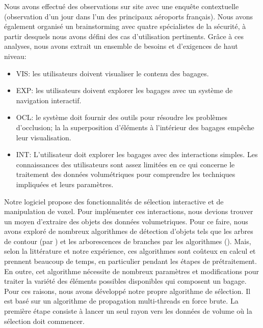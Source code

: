 Nous avons effectué des observations sur site avec une enquête contextuelle (observation d'un jour dans l'un des principaux aéroports français). Nous avons également organisé un brainstorming avec quatre spécialistes de la sécurité, à partir desquels nous avons défini des cas d'utilisation pertinents. Grâce à ces analyses, nous avons extrait un ensemble de besoins et d'exigences de haut niveau:
\begin{itemize}
\item VIS: les utilisateurs doivent visualiser le contenu des bagages.
\item EXP: les utilisateurs doivent explorer les bagages avec un système de navigation interactif.
\item  OCL: le système doit fournir des outils pour résoudre les problèmes d’occlusion; la
la superposition d'éléments à l'intérieur des bagages empêche leur visualisation.  
\item INT: L'utilisateur doit explorer les bagages avec des interactions simples. Les connaissances des utilisateurs sont assez limitées en ce qui concerne le traitement des données volumétriques pour comprendre les techniques impliquées et leurs paramètres.

\end{itemize}



Notre logiciel propose des fonctionnalités de sélection interactive et de manipulation de voxel. Pour implémenter ces interactions, nous devions trouver un moyen d'extraire des objets des données volumetriques. Pour ce faire, nous avons exploré de nombreux algorithmes de détection d’objets tels que les arbres de contour (par \cite{carr_computing_2000}) et les arborescences de branches par les algorithmes (\cite{pascucci_multi-resolution_2004}). Mais, selon la littérature et notre expérience, ces algorithmes sont coûteux en calcul et prennent beaucoup de temps, en particulier pendant les étapes de prétraitement. En outre, cet algorithme nécessite de nombreux paramètres et modifications pour traiter la variété des éléments possibles disponibles qui composent un bagage. Pour ces raisons, nous avons développé notre propre algorithme de sélection. Il est basé sur un algorithme de propagation multi-threads en force brute. La première étape consiste à lancer un seul rayon vers les données de volume où la sélection doit commencer.

